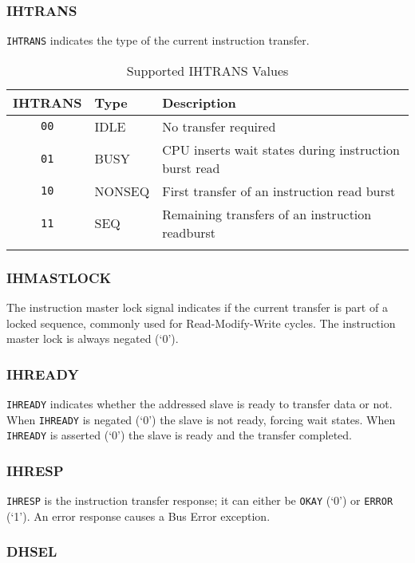 \subsubsection{IHTRANS}\label{ihtrans}

\texttt{IHTRANS} indicates the type of the current instruction transfer.

\begin{longtable}[]{@{}cll@{}}
\toprule
IHTRANS & Type & Description\tabularnewline
\midrule
\endhead
\texttt{00} & IDLE & No transfer required\tabularnewline
\texttt{01} & BUSY & CPU inserts wait states during instruction burst read\tabularnewline
\texttt{10} & NONSEQ & First transfer of an instruction read burst\tabularnewline
\texttt{11} & SEQ & Remaining transfers of an instruction readburst\tabularnewline
\bottomrule
\caption{Supported IHTRANS Values}
\end{longtable}

\subsubsection{IHMASTLOCK}\label{ihmastlock}

The instruction master lock signal indicates if the current transfer is
part of a locked sequence, commonly used for Read-Modify-Write cycles.
The instruction master lock is always negated (`0').

\subsubsection{IHREADY}\label{ihready}

\texttt{IHREADY} indicates whether the addressed slave is ready to transfer data
or not. When \texttt{IHREADY} is negated (`0') the slave is not ready, forcing
wait states. When \texttt{IHREADY} is asserted (`0') the slave is ready and the
transfer completed.

\subsubsection{IHRESP}\label{ihresp}

\texttt{IHRESP} is the instruction transfer response; it can either be \texttt{OKAY} (`0')
or \texttt{ERROR} (`1'). An error response causes a Bus Error exception.

\subsubsection{DHSEL}\label{dhsel}

